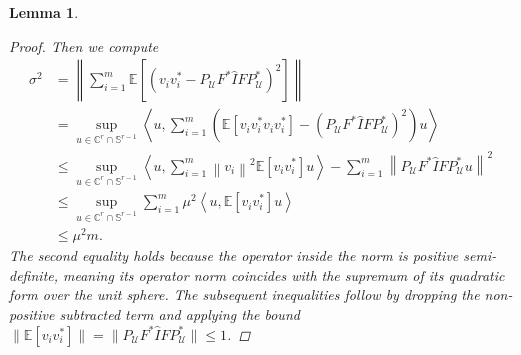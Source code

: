 \documentclass[a4paper,oneside]{amsart}
\newtheorem{lemma}[theorem]{Lemma}
\begin{document}
\begin{lemma}
\begin{proof}
      Then we compute
\begin{align*}
    \sigma^2 & = \left\|\sum_{i=1}^m \mathbb{E}\left[\left({v}_i {v}_i^* - P_{\mathcal{U}} F^*\hat{I} F P_{\mathcal{U}}^*\right)^2\right]\right\| \\
    & = \sup _{{u} \in \mathbb{C}^r \cap \mathbb{S}^{r-1}} \left\langle{u}, \sum_{i=1}^m\left(\mathbb{E}\left[{v}_i {v}_i^* {v}_i {v}_i^*\right] - \left(P_{\mathcal{U}} F^*\hat{I} F P_{\mathcal{U}}^*\right)^2 \right) {u}\right\rangle \\
    & \leq \sup _{{u} \in \mathbb{C}^r \cap \mathbb{S}^{r-1}} \left\langle{u}, \sum_{i=1}^m\left\|{v}_i\right\|^2 \mathbb{E}\left[{v}_i {v}_i^*\right] {u}\right\rangle - \sum_{i=1}^m \left\| P_{\mathcal{U}} F^*\hat{I} F P_{\mathcal{U}}^* {u}\right\|^2 \\
    & \leq \sup _{{u} \in \mathbb{C}^r \cap \mathbb{S}^{r-1}} \sum_{i=1}^m \mu^2 \left\langle{u}, \mathbb{E}\left[{v}_i {v}_i^*\right] {u}\right\rangle \\
    & \leq \mu^2 m.
\end{align*}
The second equality holds because the operator inside the norm is positive semi-definite, meaning its operator norm coincides with the supremum of its quadratic form over the unit sphere. The subsequent inequalities follow by dropping the non-positive subtracted term and applying the bound $\|\mathbb{E}[v_i v_i^*]\| = \|P_{\mathcal{U}} F^*\hat{I} F P_{\mathcal{U}}^*\| \leq 1$.


\end{proof}
\end{lemma}
\end{document}
